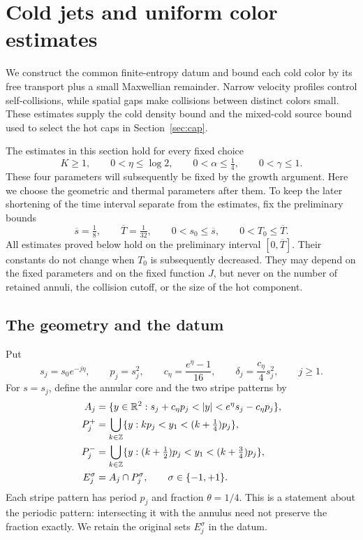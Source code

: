 \section{Cold jets and uniform color estimates}
\label{jet:section}

We construct the common finite-entropy datum and bound each cold color
by its free transport plus a small Maxwellian remainder. Narrow velocity
profiles control self-collisions, while spatial gaps make collisions
between distinct colors small. These estimates supply the cold density
bound and the mixed-cold source bound used to select the hot caps in
Section~\ref{sec:cap}.

The estimates in this section hold for every fixed choice
\[
 K\ge1,\qquad 0<\eta\le\log2,\qquad
 0<\alpha\le\tfrac14,\qquad 0<\gamma\le1.
\]
These four parameters will subsequently be fixed by the growth argument.
Here we choose the geometric and thermal parameters after them.
To keep the later shortening of the time interval separate from the
estimates, fix the preliminary bounds
\begin{equation}
 \overline s=\tfrac18,\qquad \overline T=\tfrac1{32},
 \qquad 0<s_0\le\overline s,\qquad 0<T_0\le\overline T .
 \label{jet:preliminary}
\end{equation}
All estimates proved below hold on the preliminary interval
\([0,\overline T]\).  Their constants do not change when \(T_0\) is
subsequently decreased.  They may depend on the fixed parameters and on
the fixed function \(J\), but never on the number of retained annuli,
the collision cutoff, or the size of the hot component.

\subsection{The geometry and the datum}

Put
\[
 s_j=s_0e^{-j\eta},\qquad p_j=s_j^2,\qquad
 c_\eta=\frac{e^\eta-1}{16},\qquad
 \delta_j=\frac{c_\eta}{4}s_j^2,\qquad j\ge1.
\]
For \(s=s_j\), define the annular core and the two stripe patterns by
\begin{align*}
 A_j&=\{y\in\R^2:
       s_j+c_\eta p_j<|y|<e^\eta s_j-c_\eta p_j\},\\
 P_j^+&=\bigcup_{k\in\mathbb Z}
       \{y:kp_j<y_1<(k+\tfrac14)p_j\},\\
 P_j^-&=\bigcup_{k\in\mathbb Z}
       \{y:(k+\tfrac12)p_j<y_1<(k+\tfrac34)p_j\},\\
 E_j^\sigma&=A_j\cap P_j^\sigma,\qquad \sigma\in\{-1,+1\}.
\end{align*}
Each stripe pattern has period \(p_j\) and fraction
\(\theta=1/4\).  This is a statement about the periodic pattern:
intersecting it with the annulus need not preserve the fraction
exactly.  We retain the original sets \(E_j^\sigma\) in the datum.

